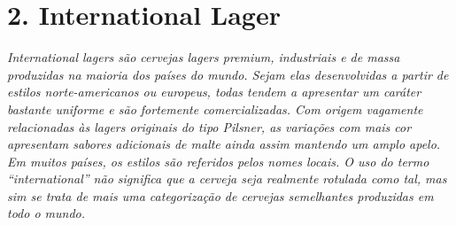 \section*{2. International Lager}
\textit{International lagers são cervejas lagers premium, industriais e de massa produzidas na maioria dos países do mundo. Sejam elas desenvolvidas a partir de estilos norte-americanos ou europeus, todas tendem a apresentar um caráter bastante uniforme e são fortemente comercializadas. Com origem vagamente relacionadas às lagers originais do tipo Pilsner, as variações com mais cor apresentam sabores adicionais de malte ainda assim mantendo um amplo apelo. Em muitos países, os estilos são referidos pelos nomes locais. O uso do termo “international” não significa que a cerveja seja realmente rotulada como tal, mas sim se trata de mais uma categorização de cervejas semelhantes produzidas em todo o mundo.}
